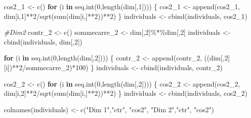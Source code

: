\documentclass[
]{article}
\newenvironment{Shaded}{\begin{snugshade}}{\end{snugshade}}
\newcommand{\CommentTok}[1]{\textcolor[rgb]{0.56,0.35,0.01}{\textit{#1}}}
\newcommand{\ControlFlowTok}[1]{\textcolor[rgb]{0.13,0.29,0.53}{\textbf{#1}}}
\newcommand{\DecValTok}[1]{\textcolor[rgb]{0.00,0.00,0.81}{#1}}
\newcommand{\FunctionTok}[1]{\textcolor[rgb]{0.00,0.00,0.00}{#1}}
\newcommand{\NormalTok}[1]{#1}
\newcommand{\OtherTok}[1]{\textcolor[rgb]{0.56,0.35,0.01}{#1}}
\newcommand{\SpecialCharTok}[1]{\textcolor[rgb]{0.00,0.00,0.00}{#1}}
\newcommand{\StringTok}[1]{\textcolor[rgb]{0.31,0.60,0.02}{#1}}
\begin{document}
\begin{Shaded}
\begin{Highlighting}[]
\NormalTok{  cos2\_1 }\OtherTok{\textless{}{-}} \FunctionTok{c}\NormalTok{()}
  \ControlFlowTok{for}\NormalTok{ (i }\ControlFlowTok{in} \FunctionTok{seq.int}\NormalTok{(}\DecValTok{0}\NormalTok{,}\FunctionTok{length}\NormalTok{(dim[,}\DecValTok{1}\NormalTok{]))) \{}
\NormalTok{    cos2\_1 }\OtherTok{\textless{}{-}} \FunctionTok{append}\NormalTok{(cos2\_1, dim[i,}\DecValTok{1}\NormalTok{]}\SpecialCharTok{**}\DecValTok{2}\SpecialCharTok{/}\FunctionTok{sqrt}\NormalTok{(}\FunctionTok{sum}\NormalTok{(dim[i,]}\SpecialCharTok{**}\DecValTok{2}\NormalTok{))}\SpecialCharTok{**}\DecValTok{2}\NormalTok{)}
\NormalTok{  \}}
\NormalTok{  individuals }\OtherTok{\textless{}{-}} \FunctionTok{cbind}\NormalTok{(individuals, cos2\_1)}
  
    \CommentTok{\#Dim2}
\NormalTok{  contr\_2 }\OtherTok{\textless{}{-}} \FunctionTok{c}\NormalTok{()}
\NormalTok{  sommecarre\_2 }\OtherTok{\textless{}{-}}\NormalTok{ dim[,}\DecValTok{2}\NormalTok{]}\SpecialCharTok{\%*\%}\NormalTok{dim[,}\DecValTok{2}\NormalTok{]}
\NormalTok{  individuals }\OtherTok{\textless{}{-}} \FunctionTok{cbind}\NormalTok{(individuals, dim[,}\DecValTok{2}\NormalTok{])}
  
  \ControlFlowTok{for}\NormalTok{ (i }\ControlFlowTok{in} \FunctionTok{seq.int}\NormalTok{(}\DecValTok{0}\NormalTok{,}\FunctionTok{length}\NormalTok{(dim[,}\DecValTok{2}\NormalTok{]))) \{}
\NormalTok{    contr\_2 }\OtherTok{\textless{}{-}} \FunctionTok{append}\NormalTok{(contr\_2, ((dim[,}\DecValTok{2}\NormalTok{][i])}\SpecialCharTok{**}\DecValTok{2}\SpecialCharTok{/}\NormalTok{sommecarre\_2)}\SpecialCharTok{*}\DecValTok{100}\NormalTok{)}
\NormalTok{  \}}
\NormalTok{  individuals }\OtherTok{\textless{}{-}} \FunctionTok{cbind}\NormalTok{(individuals, contr\_2)}

\NormalTok{  cos2\_2 }\OtherTok{\textless{}{-}} \FunctionTok{c}\NormalTok{()}
  \ControlFlowTok{for}\NormalTok{ (i }\ControlFlowTok{in} \FunctionTok{seq.int}\NormalTok{(}\DecValTok{0}\NormalTok{,}\FunctionTok{length}\NormalTok{(dim[,}\DecValTok{2}\NormalTok{]))) \{}
\NormalTok{    cos2\_2 }\OtherTok{\textless{}{-}} \FunctionTok{append}\NormalTok{(cos2\_2, dim[i,}\DecValTok{2}\NormalTok{]}\SpecialCharTok{**}\DecValTok{2}\SpecialCharTok{/}\FunctionTok{sqrt}\NormalTok{(}\FunctionTok{sum}\NormalTok{(dim[i,]}\SpecialCharTok{**}\DecValTok{2}\NormalTok{))}\SpecialCharTok{**}\DecValTok{2}\NormalTok{)}
\NormalTok{  \}}
\NormalTok{  individuals }\OtherTok{\textless{}{-}} \FunctionTok{cbind}\NormalTok{(individuals, cos2\_2)}
  
  \FunctionTok{colnames}\NormalTok{(individuals) }\OtherTok{\textless{}{-}} \FunctionTok{c}\NormalTok{(}\StringTok{"Dim 1"}\NormalTok{,}\StringTok{"ctr"}\NormalTok{, }\StringTok{"cos2"}\NormalTok{, }\StringTok{"Dim 2"}\NormalTok{,}\StringTok{"ctr"}\NormalTok{, }\StringTok{"cos2"}\NormalTok{)}
  

\end{Highlighting}
\end{Shaded}
\end{document}
